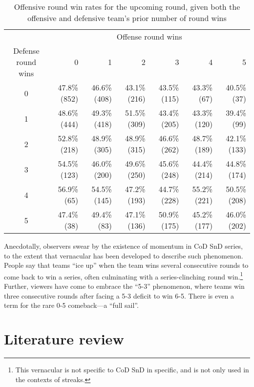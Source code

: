 \documentclass{article}
\begin{document}
\begin{longtable}{crrrrrr}
\caption{Offensive round win rates for the upcoming round, given both the offensive and defensive team's prior number of round wins}\label{tbl:cod-o-win-prop-by-series-state} \\
\toprule
& \multicolumn{6}{c}{Offense round wins} \\ 
\cmidrule(lr){2-7}
Defense round wins & 0 & 1 & 2 & 3 & 4 & 5 \\ 
\midrule
0 & 47.8\%
(852) & 46.6\%
(408) & 43.1\%
(216) & 43.5\%
(115) & 43.3\%
(67) & 40.5\%
(37) \\ 
1 & 48.6\%
(444) & 49.3\%
(418) & 51.5\%
(309) & 43.4\%
(205) & 43.3\%
(120) & 39.4\%
(99) \\ 
2 & 52.8\%
(218) & 48.9\%
(305) & 48.9\%
(315) & 46.6\%
(262) & 48.7\%
(189) & 42.1\%
(133) \\ 
3 & 54.5\%
(123) & 46.0\%
(200) & 49.6\%
(250) & 45.6\%
(248) & 44.4\%
(214) & 44.8\%
(174) \\ 
4 & 56.9\%
(65) & 54.5\%
(145) & 47.2\%
(193) & 44.7\%
(228) & 55.2\%
(221) & 50.5\%
(208) \\ 
5 & 47.4\%
(38) & 49.4\%
(83) & 47.1\%
(136) & 50.9\%
(175) & 45.2\%
(177) & 46.0\%
(202) \\ 
\bottomrule
\end{longtable}

Anecdotally, observers swear by the existence of momentum in CoD SnD
series, to the extent that vernacular has been developed to describe
such phenomenon. People say that teams ``ice up'' when the team wins
several consecutive rounds to come back to win a series, often
culminating with a series-clinching round win.\footnote{This vernacular
  is not specific to CoD SnD in specific, and is not only used in the
  contexts of streaks.} Further, viewers have come to embrace the
``5-3'' phenomenon, where teams win three consecutive rounds after
facing a 5-3 deficit to win 6-5. There is even a term for the rare 0-5
comeback---a ``full sail''.

\hypertarget{literature-review}{%
\section{Literature review}\label{literature-review}}
\end{document}

